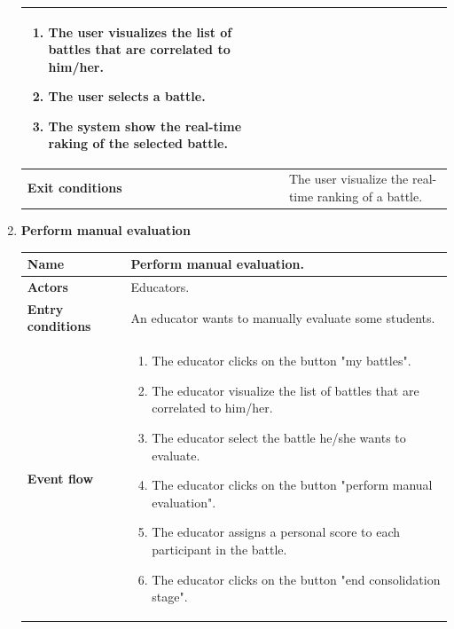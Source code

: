 \begin{enumerate}[label=\textbf{UC.\arabic*}]
\begin{table}[H]
\begin{tabular}{|m{3.2cm}|m{9.8cm}|}
\begin{enumerate}[label=\arabic*.]
                        \item The user visualizes the list of battles that are correlated to him/her.
                        \item The user selects a battle.
                        \item The system show the real-time raking of the selected battle.
                    \end{enumerate}\\ 
                    \hline
                    \textbf{Exit conditions}  & The user visualize the real-time ranking of a battle. \\
                    \hline
                \end{tabular}
        \end{table}
        \item {} \textbf{Perform manual evaluation}
        \begin{table}[H]
    	    \centering
                \renewcommand{\arraystretch}{1.5}
                \begin{tabular}{|m{3.2cm}|m{9.8cm}|}
                    \hline
                    \textbf{Name} & Perform manual evaluation. \\
                    \hline
                    \textbf{Actors} & Educators. \\
                    \hline
                    \textbf{Entry conditions}  & An educator wants to manually evaluate some students. \\
                    \hline
                    \textbf{Event flow}  & 
                    \begin{enumerate}[label=\arabic*.]
                        \item The educator clicks on the button "my battles".
                        \item The educator visualize the list of battles that are correlated to him/her.
                        \item The educator select the battle he/she wants to evaluate.
                        \item The educator clicks on the button "perform manual evaluation".
                        \item The educator assigns a personal score to each participant in the battle.
                        \item The educator clicks on the button "end consolidation stage".
                    \end{enumerate}\\ 

\end{tabular}
\end{table}
\end{enumerate}
